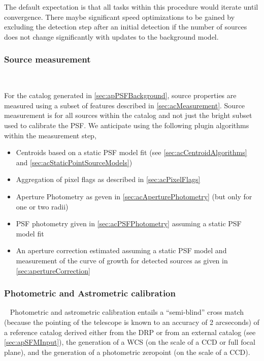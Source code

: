 The default expectation is that all tasks within this procedure would iterate until convergence.  There maybe significant speed optimizations to be gained by excluding the \Source detection step after an initial detection if the number of sources does not change significantly with updates to the background model.


\subsubsection{Source measurement}~
\label{sec:apSourcemeasurement}

For the \Source catalog generated in \ref{sec:apPSFBackground}, source properties are measured using a subset of features described in \ref{sec:acMeasurement}. Source measurement is for all sources within the \Source catalog and not just the bright subset used to calibrate the PSF.  We anticipate using the following plugin algorithms within the \Source measurement step,
\begin{itemize}
\item Centroids based on a static PSF model fit (see \ref{sec:acCentroidAlgorithms} and \ref{sec:acStaticPointSourceModels})
\item Aggregation of pixel flags as described in \ref{sec:acPixelFlags}
\item Aperture Photometry as geven in \ref{sec:acAperturePhotometry} (but only for one or two radii) 
\item PSF photometry given in \ref{sec:acPSFPhotometry} assuming a static PSF model fit
\item  An aperture correction estimated assuming a static PSF model and measurement of the curve of growth for  detected sources as given in \ref{sec:apertureCorrection}
\end{itemize}


\subsubsection{Photometric and Astrometric calibration}~ 
Photometric and astrometric calibration entails a ``semi-blind'' cross match (because the pointing of the telescope is known to an accuracy of 2 arcseconds) of a reference catalog derived either from the DRP \Objects or from an external catalog (see \ref{sec:apSFMInput}), the generation of a WCS (on the scale of a CCD or full focal plane), and the generation of a photometric zeropoint (on the scale of a CCD).

